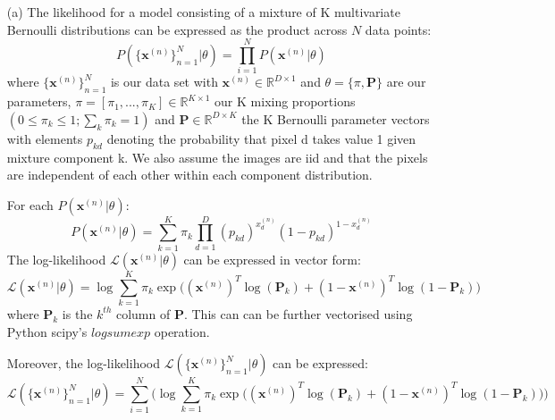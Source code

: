 \documentclass[12pt]{article}
\begin{document}
\begin{enumerate}

%
%

\item[(a)] The likelihood for a model consisting of a mixture of K multivariate Bernoulli distributions can be expressed as the product across $N$ data points:
$$P(\{\textbf{x}^{(n)}\}_{n=1}^{N}|\theta) = \prod_{i=1}^{N}P(\textbf{x}^{(n)}|\theta)$$
where $\{\textbf{x}^{(n)}\}_{n=1}^{N}$ is our data set with $\textbf{x}^{(n)} \in \mathbb{R}^{D \times 1}$ and $\theta = \{\pi, \mathbf{P}\}$ are our parameters, $\pi = [\pi_1, . . . , \pi_K] \in \mathbb{R}^{K \times 1}$ our K mixing proportions $(0 \leq \pi_k \leq 1; \sum_k \pi_k = 1)$ and $\mathbf{P} \in \mathbb{R}^{D \times K}$ the K Bernoulli parameter vectors with elements $p_{kd}$ denoting the probability that pixel d takes value 1 given mixture component k. We also assume the images are iid and that the pixels are independent of each other within each component distribution.

For each $P(\textbf{x}^{(n)}|\theta)$:
$$P(\textbf{x}^{(n)}|\theta) = \sum_{k=1}^{K} \pi_k \prod_{d=1}^D (p_{kd})^{x^{(n)}_{d}} (1-p_{kd})^{1-x^{(n)}_{d}}$$
The log-likelihood $\mathcal{L}(\textbf{x}^{(n)}|\theta)$ can be expressed in vector form:
$$\mathcal{L}(\textbf{x}^{(n)}|\theta) = \log \sum_{k=1}^{K}  \pi_k \exp\bigg((\textbf{x}^{(n)})^T \log(\mathbf{P}_{k}) + (1-\textbf{x}^{(n)})^T \log(1-\mathbf{P}_{k})\bigg) $$
where $\mathbf{P}_{k}$ is the $k^{th}$ column of $\mathbf{P}$. This can can be further vectorised using Python scipy's $logsumexp$ operation.

Moreover, the log-likelihood $\mathcal{L}(\{\textbf{x}^{(n)}\}_{n=1}^{N}|\theta)$ can be expressed:
$$\mathcal{L}(\{\textbf{x}^{(n)}\}_{n=1}^{N}|\theta) = \sum_{i=1}^{N} \Bigg( \log \sum_{k=1}^{K}  \pi_k \exp\bigg((\textbf{x}^{(n)})^T\log(\mathbf{P}_{k}) + (1-\textbf{x}^{(n)})^T\log(1-\mathbf{P}_{k})\bigg) \Bigg)$$


\end{enumerate}
\end{document}
